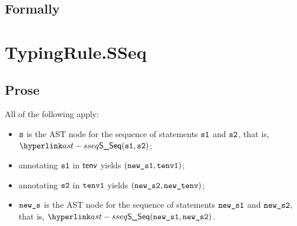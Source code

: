 

\subsection{Formally}
\begin{mathpar}
\end{mathpar}


\section{TypingRule.SSeq \label{sec:TypingRule.SSeq}}

\subsection{Prose}
All of the following apply:
\begin{itemize}
  \item $\vs$ is the AST node for the sequence of statements $\vsone$ and $\vstwo$, that is, $\SSeq(\vsone, \vstwo)$;
  \item annotating $\vsone$ in $\tenv$ yields $(\newsone, \tenvone)$\ProseOrTypeError;
  \item annotating $\vstwo$ in $\tenvone$ yields $(\newstwo, \newtenv)$\ProseOrTypeError;
  \item $\news$ is the AST node for the sequence of statements $\newsone$ and $\newstwo$, that is, $\SSeq(\newsone, \newstwo)$.
\end{itemize}


